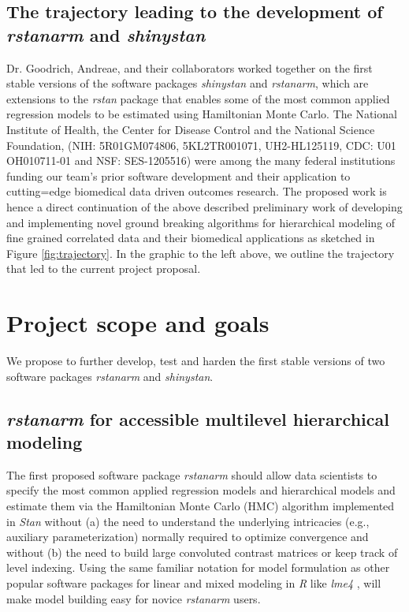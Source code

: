 \documentclass[11pt,notitlepage]{article}
\begin{document}
\subsection*{The trajectory leading to the development of \textit{rstanarm} and \textit{shinystan}} 

Dr. Goodrich, Andreae, and their collaborators worked together on the first stable versions of the software packages 
\textit{shinystan} and \textit{rstanarm}, which are extensions to the \textit{rstan} package 
that enables some of the most common applied regression models to be estimated using Hamiltonian Monte Carlo. 
The National Institute of Health, the Center for Disease Control and the National Science Foundation, 
(NIH: 5R01GM074806, 5KL2TR001071, UH2-HL125119,  CDC: U01 OH010711-01 and NSF: SES-1205516) were among the many 
federal institutions funding our team's prior software \cite{Stan-manual:2015} development and their application 
to cutting=edge biomedical data driven outcomes research. The proposed work is hence a direct continuation of the 
above described preliminary work of developing and implementing novel ground breaking algorithms for hierarchical 
modeling of fine grained correlated data and their biomedical applications as sketched in Figure \ref{fig:trajectory}. In the graphic to the left above, we 
outline the trajectory that led to the current project proposal.

\section*{Project scope and goals }

We propose to further develop, test and harden the first stable versions of two software 
packages \textit{rstanarm} and \textit{shinystan}.

\subsection*{\textit{rstanarm} for accessible multilevel hierarchical modeling}
The first proposed software package \textit{rstanarm} should allow data scientists to specify the most common applied regression models 
and hierarchical models and estimate them via the Hamiltonian Monte Carlo (HMC) algorithm implemented in \textit{Stan} without (a) 
the need to understand the underlying intricacies (e.g., auxiliary parameterization) normally required to optimize convergence and 
without (b) the need to build large convoluted contrast matrices  or keep track of level indexing. Using the same familiar notation for 
model formulation as other popular software packages for linear and mixed modeling in \textit{R} like \textit{lme4} \cite{lme4}, will 
make model building easy for novice \textit{rstanarm} users. 
\end{document}
